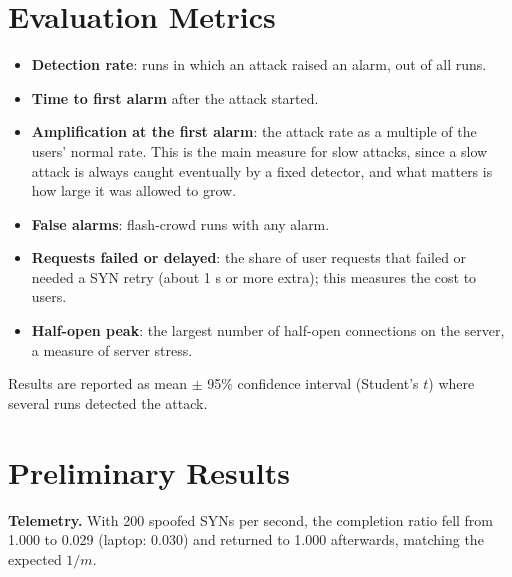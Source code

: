 \documentclass[12pt,a4paper,oneside]{report}
\begin{document}
\section{Evaluation Metrics}
\begin{itemize}
\item \textbf{Detection rate}: runs in which an attack raised an alarm, out of all runs.
\item \textbf{Time to first alarm} after the attack started.
\item \textbf{Amplification at the first alarm}: the attack rate as a multiple of the users' normal rate. This is the main measure for slow attacks, since a slow attack is always caught eventually by a fixed detector, and what matters is how large it was allowed to grow.
\item \textbf{False alarms}: flash-crowd runs with any alarm.
\item \textbf{Requests failed or delayed}: the share of user requests that failed or needed a SYN retry (about 1 s or more extra); this measures the cost to users.
\item \textbf{Half-open peak}: the largest number of half-open connections on the server, a measure of server stress.
\end{itemize}
Results are reported as mean $\pm$ 95\% confidence interval (Student's $t$) where several runs detected the attack.

\section{Preliminary Results}
\textbf{Telemetry.} With 200 spoofed SYNs per second, the completion ratio fell from 1.000 to 0.029 (laptop: 0.030) and returned to 1.000 afterwards, matching the expected $1/m$.
\end{document}
